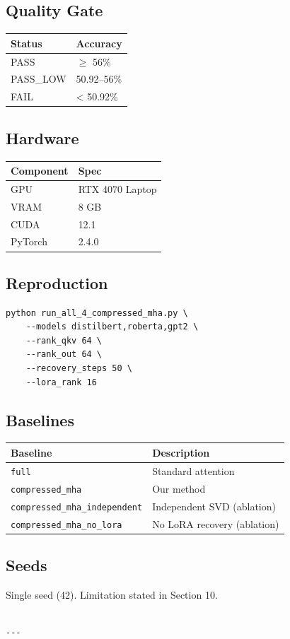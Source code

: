 \subsection{Quality Gate}

\begin{table}[H]
\centering
\small
\begin{tabular}{ll}
\toprule
\textbf{Status} & \textbf{Accuracy} \\
\midrule
PASS & $\ge$ 56\% \\
PASS\_LOW & 50.92--56\% \\
FAIL & < 50.92\% \\
\bottomrule
\end{tabular}
\end{table}

\subsection{Hardware}

\begin{table}[H]
\centering
\small
\begin{tabular}{ll}
\toprule
\textbf{Component} & \textbf{Spec} \\
\midrule
GPU & RTX 4070 Laptop \\
VRAM & 8 GB \\
CUDA & 12.1 \\
PyTorch & 2.4.0 \\
\bottomrule
\end{tabular}
\end{table}

\subsection{Reproduction}

\begin{lstlisting}
python run_all_4_compressed_mha.py \
    --models distilbert,roberta,gpt2 \
    --rank_qkv 64 \
    --rank_out 64 \
    --recovery_steps 50 \
    --lora_rank 16
\end{lstlisting}

\subsection{Baselines}

\begin{table}[H]
\centering
\small
\begin{tabular}{ll}
\toprule
\textbf{Baseline} & \textbf{Description} \\
\midrule
\texttt{full} & Standard attention \\
\texttt{compressed\_mha} & Our method \\
\texttt{compressed\_mha\_independent} & Independent SVD (ablation) \\
\texttt{compressed\_mha\_no\_lora} & No LoRA recovery (ablation) \\
\bottomrule
\end{tabular}
\end{table}

\subsection{Seeds}

Single seed (42). Limitation stated in Section 10.
\begin{lstlisting}

---
\end{lstlisting}